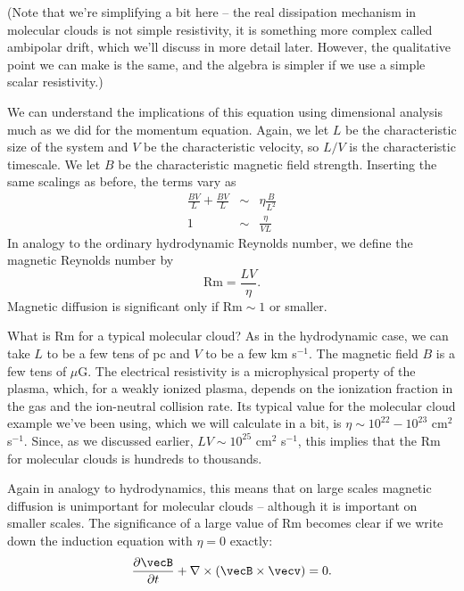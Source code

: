 (Note that we're simplifying a bit here -- the real dissipation mechanism in molecular clouds is not simple resistivity, it is something more complex called ambipolar drift, which we'll discuss in more detail later. However, the qualitative point we can make is the same, and the algebra is simpler if we use a simple scalar resistivity.)

We can understand the implications of this equation using dimensional analysis much as we did for the momentum equation. Again, we let $L$ be the characteristic size of the system and $V$ be the characteristic velocity, so $L/V$ is the characteristic timescale. We let $B$ be the characteristic magnetic field strength. Inserting the same scalings as before, the terms vary as
\begin{eqnarray}
\frac{BV}{L} + \frac{BV}{L} & \sim & \eta \frac{B}{L^2} \\
1 & \sim & \frac{\eta}{VL}
\end{eqnarray}
In analogy to the ordinary hydrodynamic Reynolds number, we define the magnetic Reynolds number by
\begin{equation}
\mbox{Rm} = \frac{LV}{\eta}.
\end{equation}
Magnetic diffusion is significant only if $\mathrm{Rm} \sim 1$ or smaller.

What is Rm for a typical molecular cloud? As in the hydrodynamic case, we can take $L$ to be a few tens of pc and $V$ to be a few km s$^{-1}$. The magnetic field $B$ is a few tens of $\mu$G. The electrical resistivity is a microphysical property of the plasma, which, for a weakly ionized plasma, depends on the ionization fraction in the gas and the ion-neutral collision rate. Its typical value for the molecular cloud example we've been using, which we will calculate in a bit, is $\eta\sim 10^{22}-10^{23}$ cm$^2$ s$^{-1}$. Since, as we discussed earlier, $LV\sim 10^{25}$ cm$^2$ s$^{-1}$, this implies that the Rm for molecular clouds is hundreds to thousands.

Again in analogy to hydrodynamics, this means that on large scales magnetic diffusion is unimportant for molecular clouds -- although it is important on smaller scales. The significance of a large value of Rm becomes clear if we write down the induction equation with $\eta=0$ exactly:
\begin{equation}
\frac{\partial \vecB}{\partial t} + \nabla \times (\vecB \times \vecv) = 0.
\end{equation}

